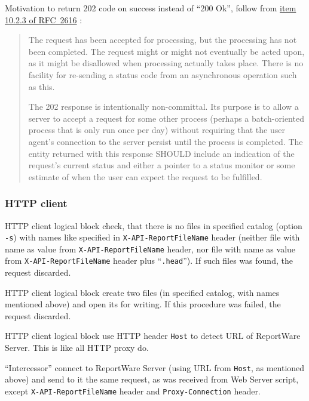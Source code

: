 \documentclass[a4paper,twoside]{article}
\newcommand{\Inter}{{\fontseries{b}\selectfont ``Intercessor''}}
\begin{document}
Motivation to return 202 code on success instead of ``200 Ok'', follow from
\href{http://www.w3.org/Protocols/rfc2616/rfc2616-sec10.html#sec10.2.3}{item 10.2.3 of RFC~2616} \cite{RFC2616}:

\begin{quotation}

 The request has been accepted for processing, but the processing
 has not been completed. The request might or might not eventually
 be acted upon, as it might be disallowed when processing actually
 takes place. There is no facility for re-sending a status code
 from an asynchronous operation such as this. 
 
 The 202 response is intentionally non-committal. Its purpose is
 to allow a server to accept a request for some other process
 (perhaps a batch-oriented process that is only run once per day)
 without requiring that the user agent's connection to the server
 persist until the process is completed. The entity returned with
 this response SHOULD include an indication of the request's current
 status and either a pointer to a status monitor or some estimate
 of when the user can expect the request to be fulfilled. 
\end{quotation}


\subsubsection{HTTP client\label{HTTPcli}}

HTTP client logical block check, that there is no files in specified catalog (option \verb|-s|)
with names like specified in \verb|X-API-ReportFileName| header (neither file with name as value from \verb|X-API-ReportFileName|
header, nor file with name as value from \verb|X-API-ReportFileName| header plus ``\verb|.head|'').
If such files was found, the request discarded.

HTTP client logical block create two files (in specified catalog, with names mentioned above) and
open its for writing. If this procedure was failed, the request discarded.

HTTP client logical block use HTTP header \verb|Host| to detect URL of ReportWare Server.
This is like all HTTP proxy do.

\Inter{} connect to ReportWare Server (using URL from \verb|Host|, as mentioned above)
and send to it the same request, as was received from Web Server script, except
\verb|X-API-ReportFileName| header and \verb|Proxy-Connection| header.
\end{document}
